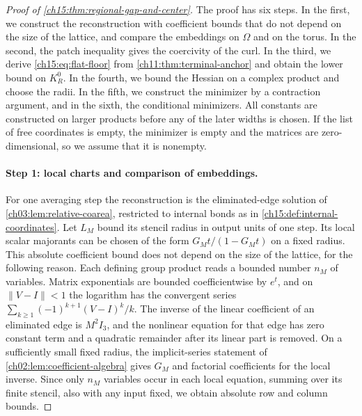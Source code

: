 \begin{proof}[Proof of \cref{ch15:thm:regional-gap-and-center}]
The proof has six steps. In the first, we construct the reconstruction with coefficient bounds that do not depend on the size of the lattice, and compare the embeddings on $\Omega$ and on the torus. In the second, the patch inequality gives the coercivity of the curl. In the third, we derive \eqref{ch15:eq:flat-floor} from \cref{ch11:thm:terminal-anchor} and obtain the lower bound on $K_R^0$. In the fourth, we bound the Hessian on a complex product and choose the radii. In the fifth, we construct the minimizer by a contraction argument, and in the sixth, the conditional minimizers. All constants are constructed on larger products before any of the later widths is chosen. If the list of free coordinates is empty, the minimizer is empty and the matrices are zero-dimensional, so we assume that it is nonempty.

\paragraph{Step 1: local charts and comparison of embeddings.}
For one averaging step the reconstruction is the eliminated-edge solution of \cref{ch03:lem:relative-coarea}, restricted to internal bonds as in \cref{ch15:def:internal-coordinates}. Let $L_M$ bound its stencil radius in output units of one step. Its local scalar majorants can be chosen of the form $G_Mt/(1-G_Mt)$ on a fixed radius. This absolute coefficient bound does not depend on the size of the lattice, for the following reason. Each defining group product reads a bounded number $n_M$ of variables. Matrix exponentials are bounded coefficientwise by $e^t$, and on $\|V-I\|<1$ the logarithm has the convergent series $\sum_{k\ge1}(-1)^{k+1}(V-I)^k/k$. The inverse of the linear coefficient of an eliminated edge is $M^2I_3$, and the nonlinear equation for that edge has zero constant term and a quadratic remainder after its linear part is removed. On a sufficiently small fixed radius, the implicit-series statement of \cref{ch02:lem:coefficient-algebra} gives $G_M$ and factorial coefficients for the local inverse. Since only $n_M$ variables occur in each local equation, summing over its finite stencil, also with any input fixed, we obtain absolute row and column bounds.


\end{proof}
